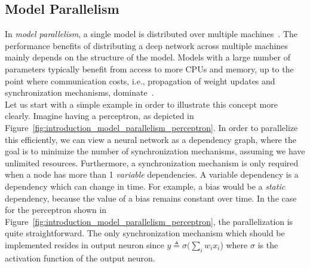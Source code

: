 \subsection{Model Parallelism}
\label{sec:intro_model_parallelism}

In \emph{model parallelism}, a single model is distributed over multiple machines~\cite{dean2012large}. The performance benefits of distributing a deep network across multiple machines mainly depends on the structure of the model. Models with a large number of parameters typically benefit from access to more CPUs and memory, up to the point where communication costs, i.e., propagation of weight updates and synchronization mechanisms, dominate~\cite{dean2012large}.\\

Let us start with a simple example in order to illustrate this concept more clearly. Imagine having a perceptron, as depicted in Figure~\ref{fig:introduction_model_parallelism_perceptron}. In order to parallelize this efficiently, we can view a neural network as a dependency graph, where the goal is to minimize the number of synchronization mechanisms, assuming we have unlimited resources. Furthermore, a synchronization mechanism is only required when a node has more than 1 \emph{variable} dependencies. A variable dependency is a dependency which can change in time. For example, a bias would be a \emph{static} dependency, because the value of a bias remains constant over time. In the case for the perceptron shown in Figure~\ref{fig:introduction_model_parallelism_perceptron}, the parallelization is quite straightforward. The only synchronization mechanism which should be implemented resides in output neuron since $y \triangleq \sigma(\sum_i w_ix_i$) where $\sigma$ is the activation function of the output neuron.

